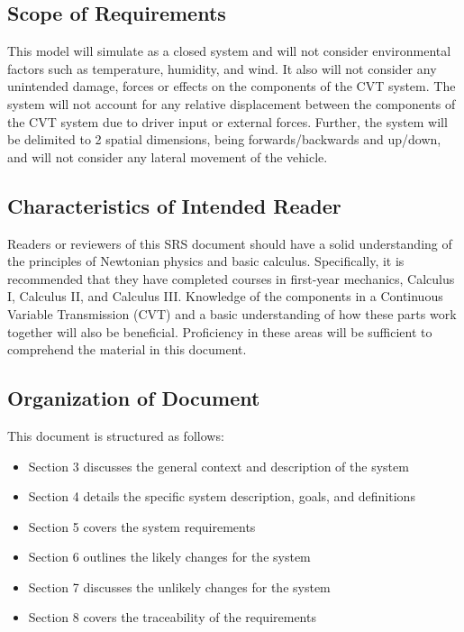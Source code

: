 \documentclass[12pt]{article}
\begin{document}
\subsection{Scope of Requirements}

This model will simulate as a closed system and will not consider environmental factors such as temperature, humidity, and wind.
It also will not consider any unintended damage, forces or effects on the components of the CVT system.
The system will not account for any relative displacement between the components of the CVT system due to driver input or external forces.
Further, the system will be delimited to 2 spatial dimensions, being forwards/backwards and up/down, and will not consider any lateral movement of the vehicle.

\subsection{Characteristics of Intended Reader} \label{sec_IntendedReader}

Readers or reviewers of this SRS document should have a solid understanding of the principles of Newtonian physics and basic calculus.
Specifically, it is recommended that they have completed courses in first-year mechanics, Calculus I, Calculus II, and Calculus III. 
Knowledge of the components in a Continuous Variable Transmission (CVT) and a basic understanding of how these parts work together will also be beneficial. 
Proficiency in these areas will be sufficient to comprehend the material in this document.

\subsection{Organization of Document}

This document is structured as follows:
\begin{itemize}
  \item Section 3 discusses the general context and description of the system
  \item Section 4 details the specific system description, goals, and definitions
  \item Section 5 covers the system requirements
  \item Section 6 outlines the likely changes for the system
  \item Section 7 discusses the unlikely changes for the system
  \item Section 8 covers the traceability of the requirements
\end{itemize}
\end{document}
